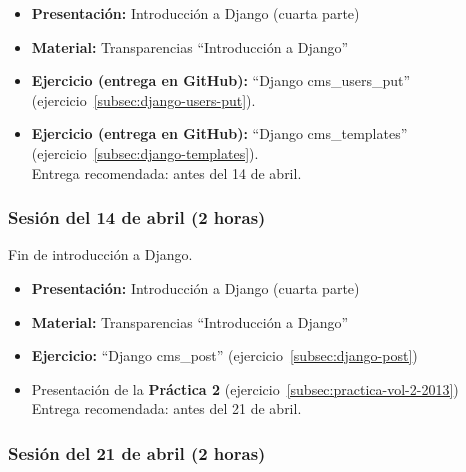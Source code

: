 \documentclass[a4paper,12pt]{article}
\begin{document}
\begin{itemize}
 \item \textbf{Presentación:} Introducción a Django (cuarta parte)
 \item \textbf{Material:} Transparencias ``Introducción a Django''
 \item \textbf{Ejercicio (entrega en GitHub):} ``Django cms\_users\_put'' (ejercicio~\ref{subsec:django-users-put}).
 \item \textbf{Ejercicio (entrega en GitHub):} ``Django cms\_templates'' (ejercicio~\ref{subsec:django-templates}). \\
  Entrega recomendada: antes del 14 de abril.
\end{itemize}


\subsubsection{Sesión del 14 de abril (2 horas)}

Fin de introducción a Django. %

\begin{itemize}
    \item \textbf{Presentación:} Introducción a Django (cuarta parte)
    \item \textbf{Material:} Transparencias ``Introducción a Django''
    \item \textbf{Ejercicio:} ``Django cms\_post'' (ejercicio~\ref{subsec:django-post})
     \item Presentación de la \textbf{Práctica 2} (ejercicio~\ref{subsec:practica-vol-2-2013}) \\
  Entrega recomendada: antes del 21 de abril.
\end{itemize}

\subsubsection{Sesión del 21 de abril (2 horas)}
\end{document}
